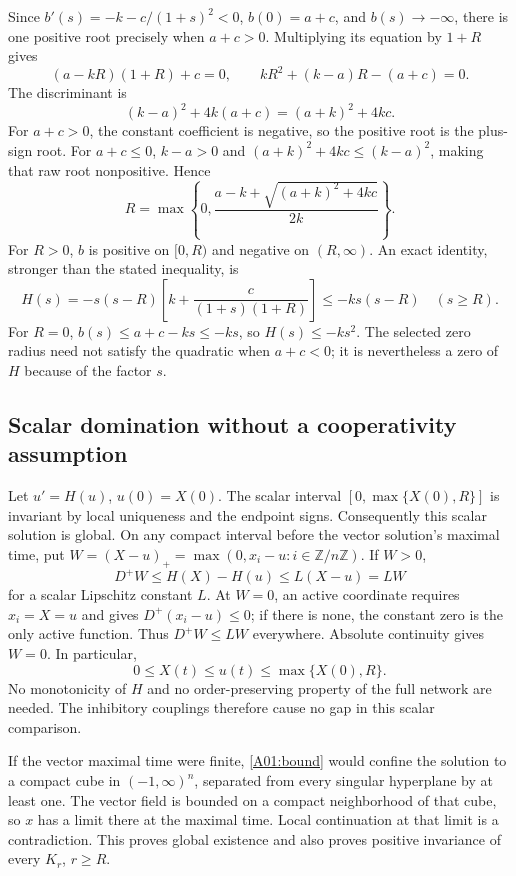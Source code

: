 \documentclass[11pt]{article}
\newcommand{\ZZ}{\mathbb Z}
\newcommand{\Dom}{(-1,\infty)^n}
\begin{document}
Since $b'(s)=-k-c/(1+s)^2<0$, $b(0)=a+c$, and $b(s)\to-\infty$,
there is one positive root precisely when $a+c>0$. Multiplying its
equation by $1+R$ gives
\[
 (a-kR)(1+R)+c=0,
 \qquad kR^2+(k-a)R-(a+c)=0.
\]
The discriminant is
\[
 (k-a)^2+4k(a+c)=(a+k)^2+4kc.
\]
For $a+c>0$, the constant coefficient is negative, so the positive
root is the plus-sign root. For $a+c\leq0$, $k-a>0$ and
$(a+k)^2+4kc\leq(k-a)^2$, making that raw root nonpositive. Hence
\begin{equation}\label{A01:R}
 R=\max\left\{0,\frac{a-k+\sqrt{(a+k)^2+4kc}}{2k}\right\}.
\end{equation}
For $R>0$, $b$ is positive on $[0,R)$ and negative on $(R,\infty)$.
An exact identity, stronger than the stated inequality, is
\begin{equation}\label{A01:factor}
 H(s)=-s(s-R)\left[k+\frac{c}{(1+s)(1+R)}\right]
       \leq-ks(s-R)\quad(s\geq R).
\end{equation}
For $R=0$, $b(s)\leq a+c-ks\leq-ks$, so $H(s)\leq-ks^2$.
The selected zero radius need not satisfy the quadratic when $a+c<0$;
it is nevertheless a zero of $H$ because of the factor $s$.

\subsection{Scalar domination without a cooperativity assumption}
Let $u'=H(u)$, $u(0)=X(0)$. The scalar interval
$[0,\max\{X(0),R\}]$ is invariant by local uniqueness and the endpoint
signs. Consequently this scalar solution is global. On any compact
interval before the vector solution's maximal time, put
$W=(X-u)_+=\max(0,x_i-u:i\in\ZZ/n\ZZ)$. If $W>0$,
\[
 D^+W\leq H(X)-H(u)\leq L(X-u)=LW
\]
for a scalar Lipschitz constant $L$. At $W=0$, an active coordinate
requires $x_i=X=u$ and gives $D^+(x_i-u)\leq0$; if there is none, the
constant zero is the only active function. Thus $D^+W\leq LW$
everywhere. Absolute continuity gives $W=0$. In particular,
\begin{equation}\label{A01:bound}
 0\leq X(t)\leq u(t)\leq\max\{X(0),R\}.
\end{equation}
No monotonicity of $H$ and no order-preserving property of the full
network are needed. The inhibitory couplings therefore cause no gap
in this scalar comparison.

If the vector maximal time were finite, \eqref{A01:bound} would confine
the solution to a compact cube in $\Dom$, separated from every singular
hyperplane by at least one. The vector field is bounded on a compact
neighborhood of that cube, so $x$ has a limit there at the maximal time.
Local continuation at that limit is a contradiction. This proves global
existence and also proves positive invariance of every $K_r$, $r\geq R$.
\end{document}
